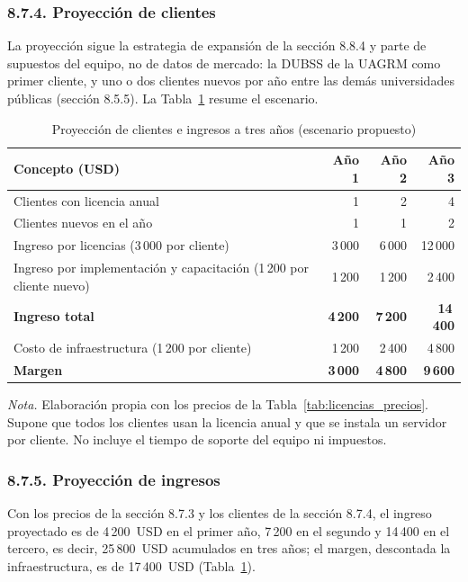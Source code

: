 \subsubsection{8.7.4. Proyección de clientes}

La proyección sigue la estrategia de expansión de la sección 8.8.4 y parte de supuestos del equipo, no de datos de mercado: la DUBSS de la UAGRM como primer cliente, y uno o dos clientes nuevos por año entre las demás universidades públicas (sección 8.5.5). La Tabla~\ref{tab:proyeccion} resume el escenario.

\begin{table}[H]
\centering
\caption{Proyección de clientes e ingresos a tres años (escenario propuesto)}
\label{tab:proyeccion}
\small
\begin{tabular}{@{}>{\raggedright\arraybackslash}p{5.2cm}rrr@{}}
\toprule
\textbf{Concepto (USD)} & \textbf{Año 1} & \textbf{Año 2} & \textbf{Año 3} \\
\midrule
Clientes con licencia anual & 1 & 2 & 4 \\
Clientes nuevos en el año & 1 & 1 & 2 \\
Ingreso por licencias (3\,000 por cliente) & 3\,000 & 6\,000 & 12\,000 \\
Ingreso por implementación y capacitación (1\,200 por cliente nuevo) & 1\,200 & 1\,200 & 2\,400 \\
\textbf{Ingreso total} & \textbf{4\,200} & \textbf{7\,200} & \textbf{14\,400} \\
Costo de infraestructura (1\,200 por cliente) & 1\,200 & 2\,400 & 4\,800 \\
\textbf{Margen} & \textbf{3\,000} & \textbf{4\,800} & \textbf{9\,600} \\
\bottomrule
\end{tabular}

\vspace{2pt}
\footnotesize\textit{Nota.} Elaboración propia con los precios de la Tabla~\ref{tab:licencias_precios}. Supone que todos los clientes usan la licencia anual y que se instala un servidor por cliente. No incluye el tiempo de soporte del equipo ni impuestos.
\end{table}

\subsubsection{8.7.5. Proyección de ingresos}

Con los precios de la sección 8.7.3 y los clientes de la sección 8.7.4, el ingreso proyectado es de 4\,200~USD en el primer año, 7\,200 en el segundo y 14\,400 en el tercero, es decir, 25\,800~USD acumulados en tres años; el margen, descontada la infraestructura, es de 17\,400~USD (Tabla~\ref{tab:proyeccion}).

